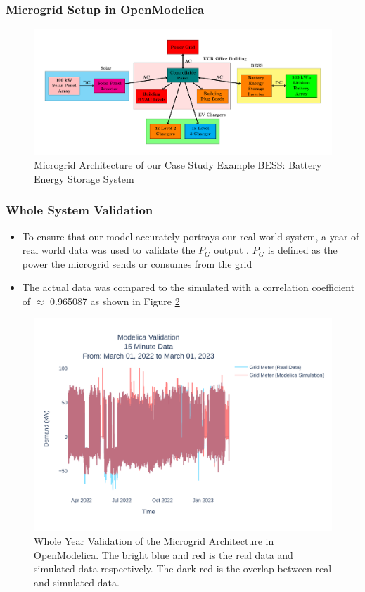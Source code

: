 \documentclass[aspectratio=169, 8 pt]{beamer}
\begin{document}
	\begin{frame}
		\frametitle{Microgrid Setup in OpenModelica}
		\begin{figure}
			\centering
			\includegraphics[width=0.9\linewidth]{Fig/power_system_setup_modelica_large}
			\caption{Microgrid Architecture of our Case Study Example BESS: Battery Energy Storage System}
			\label{fig:powersystemsetupfull}
		\end{figure}
	\end{frame}

	\begin{frame}
		\frametitle{Whole System Validation}
		\begin{itemize}
			\item To ensure that our model accurately portrays our real world system, a year of real world data was used to validate the $P_G $ output . $P_G$ is defined as the power the microgrid sends or consumes from the grid
			\item The actual data was compared to the simulated  with a correlation coefficient of  $\approx$ 0.965087 as shown in Figure \ref{fig:ucr15minutedatamar012022tomar012023}
		\end{itemize}
		\begin{figure}
			\centering
			\includegraphics[width=0.55\linewidth]{Fig/ucr_15_Minute_Data_Mar_01_2022_to_Mar_01_2023}
			\caption{Whole Year Validation of the Microgrid Architecture in OpenModelica. The bright blue and red is the real data and simulated data respectively. The dark red is the overlap between real and simulated data.}
			\label{fig:ucr15minutedatamar012022tomar012023}
		\end{figure}		
	\end{frame}
\end{document}
